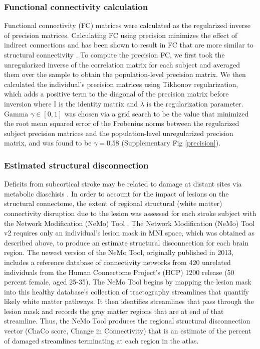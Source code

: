 \documentclass[10pt]{article}
\begin{document}
	\subsubsection*{Functional connectivity calculation}
	 Functional connectivity (FC) matrices were calculated as the regularized inverse of precision matrices. Calculating FC using precision minimizes the effect of indirect connections and has been shown to result in FC that are more similar to structural connectivity \cite{Wodeyar2020-kz, Liegeois2020-ua}. To compute the precision FC, we first took the unregularized inverse of the correlation matrix for each subject and averaged them over the sample to obtain the population-level precision matrix. We then calculated the individual’s precision matrices using Tikhonov regularization, which adds a positive term to the diagonal of the precision matrix before inversion where I is the identity matrix and $ \lambda $ is the regularization parameter. Gamma $\gamma \in [0,1]$ was chosen via a grid search to be the value that minimized the root mean squared error of the Frobenius norms between the regularized subject precision matrices and the population-level unregularized precision matrix, and was found to be $\gamma = 0.58$ (Supplementary Fig \ref{precision}).
	
	\subsubsection*{Estimated structural disconnection}
	Deficits from subcortical stroke may be related to damage at distant sites via metabolic diaschisis \cite{Hillis2002-dz, Corbetta2015-ez}. In order to account for the impact of lesions on the structural connectome, the extent of regional structural (white matter) connectivity disruption due to the lesion was assessed for each stroke subject with the Network Modification (NeMo) Tool \cite{Kuceyeski2013-nk}. The Network Modification (NeMo) Tool v2 requires only an individual’s lesion mask in MNI space, which was obtained as described above, to produce an estimate structural disconnection for each brain region. The newest version of the NeMo Tool, originally published in 2013, includes a reference database of connectivity networks from 420 unrelated individuals from the Human Connectome Project’s (HCP) 1200 release (50 percent female, aged 25-35). The NeMo Tool begins by mapping the lesion mask into this healthy database’s collection of tractography streamlines that quantify likely white matter pathways. It then identifies streamlines that pass through the lesion mask and records the gray matter regions that are at end of that streamline. Thus, the NeMo Tool produces the regional structural disconnection vector (ChaCo score, Change in Connectivity) that is an estimate of the percent of damaged streamlines terminating at each region in the atlas.
	
\end{document}
